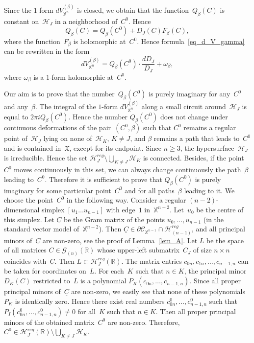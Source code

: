 \documentclass[reqno,tbtags,12pt]{amsart}
\numberwithin{equation}{section}
\newcommand{\R}{\mathbb{R}}
\newcommand{\CH}{\mathcal{H}}
\newcommand{\CC}{\mathcal{C}}
\newcommand{\X}{\mathbb{X}}
\newcommand{\FX}{\mathfrak{X}}
\newcommand{\CG}{\mathcal{G}}
\newcommand{\uC}{\underline{C}}
\theoremstyle{definition}
\begin{document}
Since the $1$-form $dV_{\X^n}^{(\beta)}$ is closed, we obtain that the function~$Q_{\beta}(C)$ is constant on~$\CH_J$ in a neighborhood of~$C^0$. Hence $$Q_{\beta}(C)=Q_{\beta}(C^0)+D_J(C)F_{\beta}(C),$$ where the function~$F_{\beta}$ is holomorphic at~$C^0$. Hence formula~\eqref{eq_d_V_gamma} can be rewritten in the form
\begin{equation}\label{eq_d_V_gamma2}
dV_{\X^n}^{(\beta)}=Q_{\beta}(C^0)\cdot\frac{dD_J}{D_J}+\omega_{\beta},
\end{equation}
where $\omega_{\beta}$ is a $1$-form holomorphic at~$C^0$. 

Our aim is to prove that the number~$Q_{\beta}(C^0)$ is purely imaginary for any~$C^0$ and any~$\beta$. The integral of the $1$-form $dV_{\X^n}^{(\beta)}$ along a small circuit around~$\CH_J$ is equal to $2\pi i Q_{\beta}(C^0)$. Hence the number $Q_{\beta}(C^0)$ does not change under   continuous deformations of the pair~$(C^0,\beta)$ such that $C^0$ remains a regular point of~$\CH_J$ lying on none of~$\CH_K$, $K\ne J$, and $\beta$ remains a path that leads to~$C^0$ and is contained in~$\FX$, except for its endpoint. Since $n\ge 3$, the hypersurface~$\CH_J$ is irreducible. Hence the set $\CH_J^{reg}\setminus\bigcup_{K\ne J}\CH_K$  is connected. Besides, if the point~$C^0$ moves continuously in this set, we can always change continuously the path~$\beta$ leading to~$C^0$. Therefore it is sufficient to prove that $Q_{\beta}(C^0)$ is purely imaginary for some particular point~$C^0$ and for all paths~$\beta$ leading to it. We choose the point~$C^0$ in the following way. Consider a regular $(n-2)$-dimensional simplex $[u_1\ldots u_{n-1}]$ with edge~$1$ in~$\X^{n-2}$. Let~$u_0$ be the centre of this simplex. Let $\uC$ be the Gram matrix of the points $u_0,\ldots,u_{n-1}$ (in the standard vector model of~$\X^{n-2}$). Then $\uC\in\partial\CC_{\X^{n-1}}\cap\CH^{reg}_{(n-1)}$, and all principal minors of~$\uC$ are non-zero, see the proof of Lemma~\ref{lem_A}. Let $L$ be the space of all matrices $C\in\CG_{(n)}(\R)$ whose upper-left submatrix~$C_J$ of size $n\times n$ coincides with~$\uC$. Then $L\subset\CH_J^{reg}(\R)$. The matrix entries $c_{0n},c_{1n},\ldots,c_{n-1,n}$ can be taken for coordinates on~$L$. For each~$K$ such that $n\in K$, the principal minor $D_K(C)$ restricted to~$L$ is a polynomial $P_K(c_{0n},\ldots,c_{n-1,n})$. Since all proper principal minors of~$\uC$ are non-zero, we easily see that none of these polynomials~$P_K$  is identically zero. Hence there exist real numbers $c_{0n}^0,\ldots,c_{n-1,n}^0$ such that $P_I(c_{0n}^0,\ldots,c_{n-1,n}^0)\ne 0$ for all~$K$ such that $n\in K$. Then all proper principal minors of the obtained matrix~$C^0$ are non-zero. Therefore, $C^0\in\CH^{reg}_J(\R)\setminus\bigcup_{K\ne J}\CH_K$.
\end{document}
